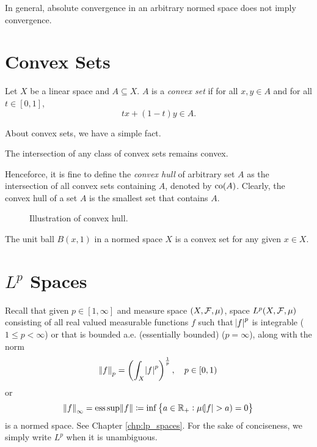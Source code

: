 \begin{rmk}
In general, absolute convergence in an arbitrary normed space does not 
imply convergence. 
\end{rmk}

\section{Convex Sets}
\begin{defn}
Let $X$ be a linear space and $A \subseteq X$. 
$A$ is a \emph{convex set} if for all $x, y \in A$ and for all $t \in [0, 1]$, 
\begin{equation*}
    tx + (1-t) y \in A.
\end{equation*}
\end{defn}

About convex sets, we have a simple fact. 
\begin{prop}
The intersection of any class of convex sets remains convex. 
\end{prop}
Henceforce, it is fine to define the \emph{convex hull} of arbitrary set 
$A$ as the intersection of all convex sets containing $A$, denoted by 
$\operatorname{co}(A)$. 
Clearly, the convex hull of a set $A$ is the smallest set that contains $A$. 
\begin{figure}[ht]
    \centering
    \caption{Illustration of convex hull. }
\end{figure}

\begin{example}
The unit ball $B(x, 1)$ in a normed space $X$ is a convex set 
for any given $x \in X$. 
\end{example}

\section{$L^p$ Spaces}
Recall that given $p \in [1, \infty]$ and measure space $(X, \mathcal{F}, \mu)$, 
space $L^p(X, \mathcal{F}, \mu)$ consisting of all real valued measurable functions 
$f$ such that $\abs{f} ^p$ is integrable ($1 \le p < \infty$) or that is  
bounded a.e. (essentially bounded) ($p = \infty$), along with the norm 
\begin{equation*}
    \norm{f}_p = \left( \int_{X} \abs{f}^p \right) ^\frac{1}{p}, \quad 
    p \in [0, 1)
\end{equation*}
or 
\begin{equation*}
    \norm{f}_\infty = \operatorname{ess\,sup} \norm{f} 
    \coloneqq \inf \left\{ a \in \mathbb{R}_+: \mu(\abs{f} > a) = 0 \right\}
\end{equation*}
is a normed space. 
See Chapter \ref{chp:lp_spaces}. 
For the sake of conciseness, we simply write $L^p$ when it is unambiguous. 

